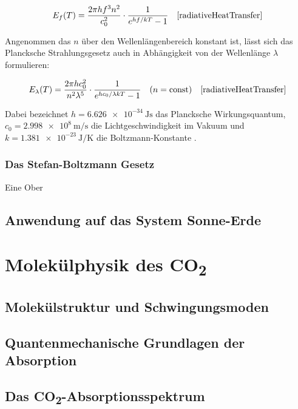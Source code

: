 \documentclass[12pt,a4paper]{article}
\begin{document}
\begin{equation}
  \label{Plancksche Ausstrahlung Frequenz}
  E_f(T) = \frac{2\pi h f^3 n^2}{c_0^2} \cdot \frac{1}{e^{hf/kT}-1} 
  \quad \text{\cite[S.8]{radiativeHeatTransfer}}
\end{equation}

Angenommen das $n$ über den Wellenlängenbereich konstant ist, lässt sich das Plancksche Strahlungsgesetz auch in Abhängigkeit von der Wellenlänge $\lambda$ formulieren:

\begin{equation}
  \label{Plancksche Ausstrahlung Wellenlänge}
  E_{\lambda}(T) = \frac{2\pi h c_0^2}{n^2\lambda^5} \cdot \frac{1}{e^{hc_0/\lambda kT}-1}
  \quad (n = \text{const}) \quad \text{\cite[S.9]{radiativeHeatTransfer}}
\end{equation}

Dabei bezeichnet $h = \SI{6.626e-34}{\joule\second}$ das Plancksche Wirkungsquantum, 
$c_0 = \SI{2.998e8}{\meter\per\second}$ die Lichtgeschwindigkeit im Vakuum 
und $k = \SI{1.381e-23}{\joule\per\kelvin}$ die Boltzmann-Konstante \cite{codata2018}.

\subsubsection{Das Stefan-Boltzmann Gesetz}
Eine Ober


\subsection{Anwendung auf das System Sonne-Erde}

\section{Molekülphysik des CO\textsubscript{2}}

\subsection{Molekülstruktur und Schwingungsmoden}

\subsection{Quantenmechanische Grundlagen der Absorption}

\subsection{Das CO\textsubscript{2}-Absorptionsspektrum}
\end{document}
